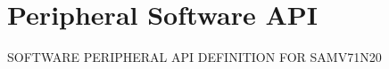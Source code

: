 \hypertarget{group__SAMV71N20__api}{}\section{Peripheral Software A\+PI}
\label{group__SAMV71N20__api}
S\+O\+F\+T\+W\+A\+RE P\+E\+R\+I\+P\+H\+E\+R\+AL A\+PI D\+E\+F\+I\+N\+I\+T\+I\+ON F\+OR S\+A\+M\+V71\+N20 